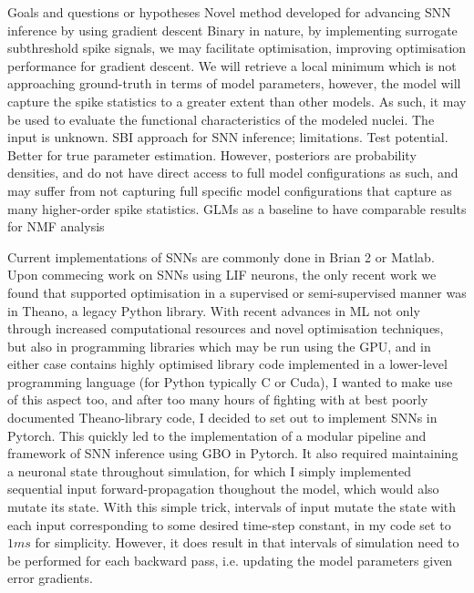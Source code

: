 \documentclass[mphil,deptreport,ai]{infthesis} %
\begin{document}
Goals and questions or hypotheses
Novel method developed for advancing SNN inference by using gradient descent
Binary in nature, by implementing surrogate subthreshold spike signals, we may facilitate optimisation, improving optimisation performance for gradient descent.
We will retrieve a local minimum which is not approaching ground-truth in terms of model parameters, however, the model will capture the spike statistics to a greater extent than other models. As such, it may be used to evaluate the functional characteristics of the modeled nuclei.
The input is unknown.
SBI approach for SNN inference; limitations. Test potential.
Better for true parameter estimation. However,  posteriors are probability densities, and do not have direct access to full model configurations as such, and may suffer from not capturing full specific model configurations that capture as many higher-order spike statistics.
GLMs as a baseline to have comparable results for NMF analysis


Current implementations of SNNs are commonly done in Brian 2 or Matlab. Upon commecing work on SNNs using LIF neurons, the only recent work we found that supported optimisation in a supervised or semi-supervised manner was in Theano, a legacy Python library.
With recent advances in ML not only through increased computational resources and novel optimisation techniques, but also in programming libraries which may be run using the GPU, and in either case contains highly optimised library code implemented in a lower-level programming language (for Python typically C or Cuda), I wanted to make use of this aspect too, and after too many hours of fighting with at best poorly documented Theano-library code, I decided to set out to implement SNNs in Pytorch.
This quickly led to the implementation of a modular pipeline and framework of SNN inference using GBO in Pytorch.
It also required maintaining a neuronal state throughout simulation, for which I simply implemented sequential input forward-propagation thoughout the model, which would also mutate its state.
With this simple trick, intervals of input mutate the state with each input corresponding to some desired time-step constant, in my code set to $1 ms$ for simplicity. %
However, it does result in that intervals of simulation need to be performed for each backward pass, i.e. updating the model parameters given error gradients.
\end{document}
